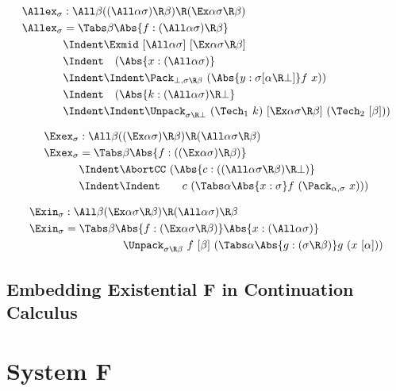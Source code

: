 \documentclass{amsart}
\begin{document}
\begin{align*}
\Allex_\sigma & : \All\beta
  ((\All\alpha\sigma) \R \beta) \R
  (\Ex\alpha \sigma \R \beta)
  \\
\Allex_\sigma & = \Tabs\beta
\Abs{f:(\All\alpha\sigma)\R\beta}
\\&\Indent
\Exmid~[\All\alpha\sigma]~[\Ex\alpha\sigma\R\beta]
\\&\Indent\hspace{1em}
(\Abs{x:(\All\alpha\sigma)}
\\&\Indent\Indent
\Pack_{\bot,\sigma\R\beta}~(
  \Abs{y:\sigma[\alpha\R\bot]} f~x))
\\&\Indent\hspace{1em}
(\Abs{k:(\All\alpha\sigma)\R\bot}
\\&\Indent\Indent
\Unpack_{\sigma\R\bot}~(\Tech_1~k)~[
  \Ex\alpha\sigma\R\beta
]~(\Tech_2~[\beta]))
\end{align*}

\begin{align*}
\Exex_\sigma & : \All\beta
  ((\Ex\alpha \sigma) \R \beta) \R
  (\All\alpha \sigma \R \beta)
  \\
\Exex_\sigma & = \Tabs\beta
  \Abs{f:((\Ex\alpha\sigma) \R \beta)}
  \\ &\Indent
  \AbortCC~(\Abs{c : ((\All\alpha \sigma \R \beta) \R \bot)}
  \\ &\Indent\Indent\hspace{2em}
  c~(\Tabs\alpha \Abs{x : \sigma}
  f~(\Pack_{\alpha,\sigma}~x)))
\end{align*}

\begin{align*}
\Exin_\sigma & : \All\beta
  (\Ex\alpha \sigma \R \beta) \R
  (\All\alpha\sigma) \R \beta
  \\
\Exin_\sigma & = \Tabs\beta
  \Abs{f : (\Ex\alpha \sigma \R \beta)}
  \Abs{x : (\All\alpha \sigma)}
  \\ &\hspace{5.3em}
\Unpack_{\sigma\R\beta}~f~[\beta]~(
\Tabs\alpha
\Abs{g : (\sigma \R \beta)}
g~(x~[\alpha]))
\end{align*}

\subsection{Embedding Existential F in Continuation Calculus}
\label{sec:desugar}

\section{System F}
\end{document}

